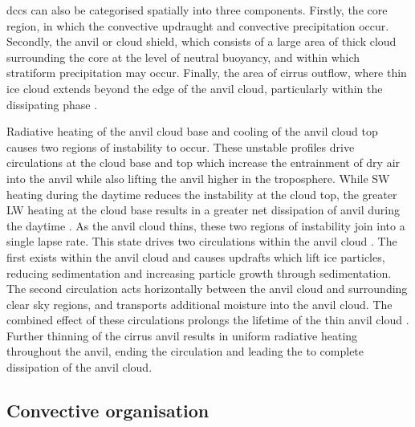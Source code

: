 \acrshort{dcc}s can also be categorised spatially into three components.
Firstly, the core region, in which the convective updraught and convective precipitation occur.
Secondly, the anvil or cloud shield, which consists of a large area of thick cloud surrounding the core at the level of neutral buoyancy, and within which stratiform precipitation may occur.
Finally, the area of cirrus outflow, where thin ice cloud extends beyond the edge of the anvil cloud, particularly within the dissipating phase \citep{lilly_cirrus_1988}.

Radiative heating of the anvil cloud base and cooling of the anvil cloud top causes two regions of instability to occur. 
These unstable profiles drive circulations at the cloud base and top which increase the entrainment of dry air into the anvil while also lifting the anvil higher in the troposphere. 
While SW heating during the daytime reduces the instability at the cloud top, the greater LW heating at the cloud base results in a greater net dissipation of anvil during the daytime \citep{sokol_tropical_2020}. 
As the anvil cloud thins, these two regions of instability join into a single lapse rate. 
This state drives two circulations within the anvil cloud \citep{gasparini_opinion_2023}. 
The first exists within the anvil cloud and causes updrafts which lift ice particles, reducing sedimentation and increasing particle growth through sedimentation. 
The second circulation acts horizontally between the anvil cloud and surrounding clear sky regions, and transports additional moisture into the anvil cloud. 
The combined effect of these circulations prolongs the lifetime of the thin anvil cloud \citep{sokol_tropical_2020}. 
Further thinning of the cirrus anvil results in uniform radiative heating throughout the anvil, ending the circulation and leading the to complete dissipation of the anvil cloud. 


\subsection{Convective organisation}

